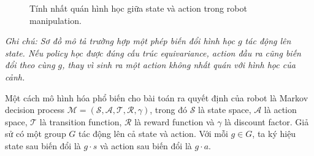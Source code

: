 \begin{figure}[H]
    \centering
    \caption{Tính nhất quán hình học giữa state và action trong robot manipulation.}
    \label{fig:robotics-equivariance}
\end{figure}

\noindent\textit{Ghi chú: Sơ đồ mô tả trường hợp một phép biến đổi hình học $g$ tác động lên state. Nếu policy học được đúng cấu trúc equivariance, action đầu ra cũng biến đổi theo cùng $g$, thay vì sinh ra một action không nhất quán với hình học của cảnh.}

Một cách mô hình hóa phổ biến cho bài toán ra quyết định của robot là Markov decision process $\mathcal{M}=(\mathcal{S},\mathcal{A},\mathcal{T},\mathcal{R},\gamma)$, trong đó $\mathcal{S}$ là state space, $\mathcal{A}$ là action space, $\mathcal{T}$ là transition function, $\mathcal{R}$ là reward function và $\gamma$ là discount factor. Giả sử có một group $G$ tác động lên cả state và action. Với mỗi $g \in G$, ta ký hiệu state sau biến đổi là $g \cdot s$ và action sau biến đổi là $g \cdot a$.

